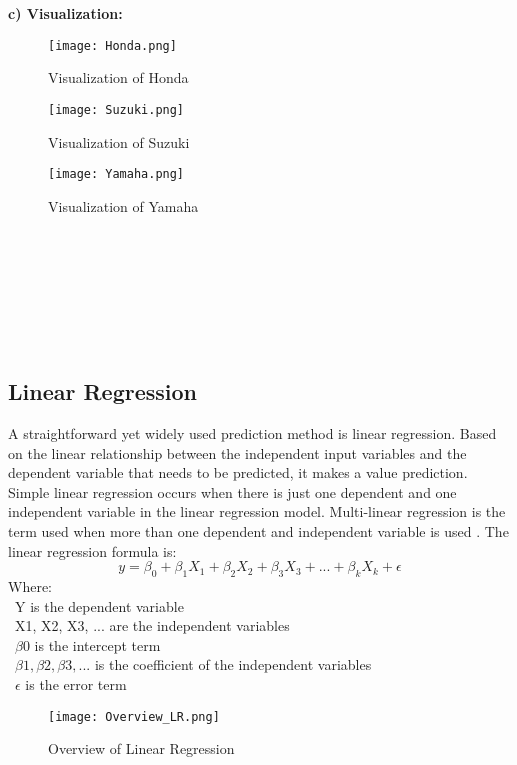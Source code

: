 \documentclass{ieeeojies}
\begin{document}
\textbf{c) Visualization:}
\begin{figure} [H]
    \centering
    \texttt{[image: Honda.png]}
    \caption{Visualization of Honda}
    \label{fig:enter-label}
\end{figure}
\begin{figure} [H]
    \centering
    \texttt{[image: Suzuki.png]}
    \caption{Visualization of Suzuki}
    \label{fig:enter-label}
\end{figure}
\begin{figure} [H]
    \centering
    \texttt{[image: Yamaha.png]}
    \caption{Visualization of Yamaha}
    \label{fig:enter-label}
\end{figure}
\\
\\
\\
\\
\\
\\
\subsection{Linear Regression}
A straightforward yet widely used prediction method is linear regression. Based on the linear relationship between the independent input variables and the dependent variable that needs to be predicted, it makes a value prediction. Simple linear regression occurs when there is just one dependent and one independent variable in the linear regression model. Multi-linear regression is the term used when more than one dependent and independent variable is used \cite{tai2}. The linear regression formula is:
\begin{equation}
y=\beta_0+{\beta_1}X_1+{\beta_2}X_2+{\beta_3}X_3+...+{\beta_k}X_k+\epsilon
\end{equation} \cite{tai2}
Where:\\
\textbullet \ Y is the dependent variable\\
\textbullet \ X1, X2, X3, ... are the independent variables\\
\textbullet \ $\beta0$ is the intercept term\\
\textbullet \ $\beta1, \beta2, \beta3, ...$ is the coefficient of the independent variables\\
\textbullet \ $\epsilon$ is the error term\\
\begin{figure} [H]
    \centering
    \texttt{[image: Overview\_LR.png]}
    \caption{Overview of Linear Regression}
    \label{fig:enter-label}
\end{figure}
\end{document}
